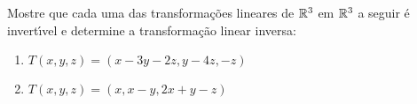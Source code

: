 \documentclass[12pt]{exam}
\begin{document}


\begin{exercicio}
  Mostre que cada uma das transforma\c{c}\~oes lineares de $\mathbb{R}^3$ em $\mathbb{R}^3$ a seguir \'e invert{\'\i}vel e determine a transforma\c{c}\~ao linear inversa:
  \begin{enumerate}[label=({\alph*})]
    \item $T(x,y,z) = (x - 3y - 2z, y - 4z, -z)$
    \item $T(x,y,z) = (x, x - y, 2x + y -z)$
  \end{enumerate}
\end{exercicio}
\end{document}
